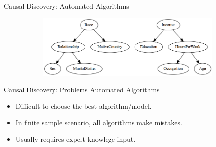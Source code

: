 \documentclass[aspectratio=169]{beamer}
\begin{document}
\begin{frame}{Causal Discovery: Automated Algorithms}
\begin{figure}
		\begin{subfigure}{0.55 \textwidth}
			\centering
			\includegraphics[scale=0.25]{imgs/adult_pillai.png}
		\end{subfigure}
	\end{figure}
\end{frame}

\begin{frame}{Causal Discovery: Problems Automated Algorithms}
	\begin{itemize}
		\item Difficult to choose the best algorithm/model.
		\item In finite sample scenario, all algorithms make mistakes.
		\item Usually requires expert knowlege input.
	\end{itemize}

	\vspace{2em}

\end{frame}
\end{document}

